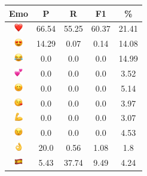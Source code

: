 \documentclass{article}
\begin{document}
\begin{table}
\centering
\begin{tabular}{|c|ccc|c|} \hline
\textbf{Emo} & \textbf{P} & \textbf{R} & \textbf{F1} & \textbf{\%} \\ \hline
\includegraphics[height=0.37cm,width=0.37cm]{img/red_heart.png} & 66.54 & 55.25 & 60.37 & 21.41\\ 
\includegraphics[height=0.37cm,width=0.37cm]{img/smiling_face_with_hearteyes.png} & 14.29 & 0.07 & 0.14 & 14.08\\ 
\includegraphics[height=0.37cm,width=0.37cm]{img/face_with_tears_of_joy.png} & 0.0 & 0.0 & 0.0 & 14.99\\ 
\includegraphics[height=0.37cm,width=0.37cm]{img/two_hearts.png} & 0.0 & 0.0 & 0.0 & 3.52\\ 
\includegraphics[height=0.37cm,width=0.37cm]{img/smiling_face_with_smiling_eyes.png} & 0.0 & 0.0 & 0.0 & 5.14\\ 
\includegraphics[height=0.37cm,width=0.37cm]{img/face_blowing_a_kiss.png} & 0.0 & 0.0 & 0.0 & 3.97\\ 
\includegraphics[height=0.37cm,width=0.37cm]{img/flexed_biceps.png} & 0.0 & 0.0 & 0.0 & 3.07\\ 
\includegraphics[height=0.37cm,width=0.37cm]{img/winking_face.png} & 0.0 & 0.0 & 0.0 & 4.53\\ 
\includegraphics[height=0.37cm,width=0.37cm]{img/OK_hand.png} & 20.0 & 0.56 & 1.08 & 1.8\\ 
\includegraphics[height=0.37cm,width=0.37cm]{img/Spain.png} & 5.43 & 37.74 & 9.49 & 4.24\\ 

\end{tabular}
\end{table}
\end{document}
